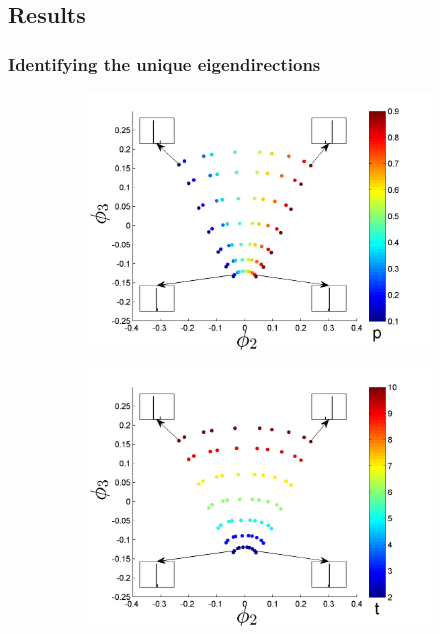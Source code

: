 \documentclass[preprint]{elsarticle}
\begin{document}
\subsection{Results}

\subsubsection{Identifying the unique eigendirections}

\begin{figure}[t!]
\def \figwidth {3.5cm}

\centering
\begin{subfigure}{\figwidth}
\includegraphics[width=\textwidth]{EMD_withhist_p_1}
\caption{}
\label{subfig:small_lambda_p}
\end{subfigure}
\begin{subfigure}{\figwidth}
\includegraphics[width=\textwidth]{EMD_withhist_t_1}

\end{subfigure}
\end{figure}
\end{document}
